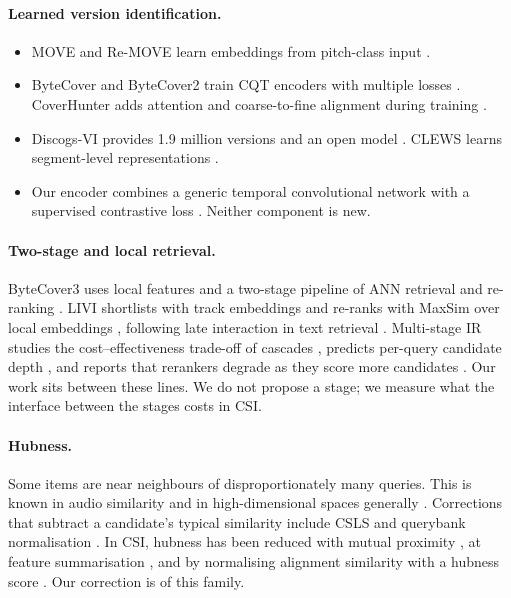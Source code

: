 \documentclass[10pt]{article}
\begin{document}
\paragraph{Learned version identification.}
\begin{itemize}
\item MOVE and Re-MOVE learn embeddings from pitch-class input \citep{move2020,remove2020}.
\item ByteCover and ByteCover2 train CQT encoders with multiple losses \citep{bytecover,bytecover2}. CoverHunter adds attention and coarse-to-fine alignment during training \citep{coverhunter}.
\item Discogs-VI provides 1.9 million versions and an open model \citep{discogsvi}. CLEWS learns segment-level representations \citep{clews}.
\item Our encoder combines a generic temporal convolutional network \citep{bai2018tcn} with a supervised contrastive loss \citep{khosla2020supcon}. Neither component is new.
\end{itemize}

\paragraph{Two-stage and local retrieval.}
ByteCover3 uses local features and a two-stage pipeline of ANN retrieval and re-ranking \citep{bytecover3}. LIVI shortlists with track embeddings and re-ranks with MaxSim over local embeddings \citep{livi2026}, following late interaction in text retrieval \citep{colbert}.
Multi-stage IR studies the cost--effectiveness trade-off of cascades \citep{wang2011cascade}, predicts per-query candidate depth \citep{culpepper2016}, and reports that rerankers degrade as they score more candidates \citep{jacob2024drowning}.
Our work sits between these lines. We do not propose a stage; we measure what the interface between the stages costs in CSI.

\paragraph{Hubness.}
Some items are near neighbours of disproportionately many queries. This is known in audio similarity \citep{aucouturier2008} and in high-dimensional spaces generally \citep{radovanovic2010,schnitzer2012}.
Corrections that subtract a candidate's typical similarity include CSLS \citep{csls} and querybank normalisation \citep{qbnorm}. In CSI, hubness has been reduced with mutual proximity \citep{li2018}, at feature summarisation \citep{hu2019}, and by normalising alignment similarity with a hubness score \citep{seo2022}.
Our correction is of this family.
\end{document}
